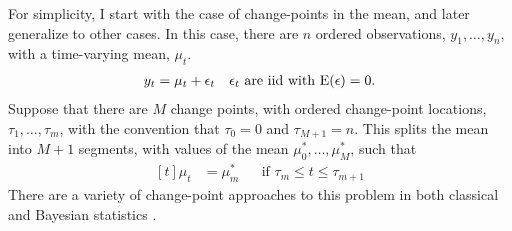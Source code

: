 For simplicity, I start with the case of change-points in the mean, and later generalize to other cases.
In this case, there are $n$ ordered observations, $y_{1}, \dots, y_{n}$, with a time-varying mean, $\mu_{t}$.
\begin{equation}
  \label{dlm:eq:17}
  \begin{aligned}[t]
    y_{t} & = \mu_{t} + \epsilon_{t} && \text{$\epsilon_{t}$ are iid with $\operatorname{E}(\epsilon) = 0$.} \\  
  \end{aligned}
\end{equation}
Suppose that there are $M$ change points, with ordered change-point locations, $\tau_{1}, \dots, \tau_{m}$, with the convention that $\tau_{0} = 0$ and $\tau_{M + 1} = n$.
This splits the mean into $M + 1$ segments, with values of the mean $\mu^{*}_{0}, \dots, \mu^{*}_{M}$,  such that
\begin{equation}
  \label{dlm:eq:1}
  \begin{aligned}[t]
    \mu_{t} &= \mu^{*}_{m} && \text{if $\tau_{m} \leq t \leq \tau_{m + 1}$}
  \end{aligned}
\end{equation}
There are a variety of change-point approaches to this problem in both classical \parencites{Page1954a}{Hinkley1970a}{BaiPerron2003a}{OlshenVenkatramanLucitoEtAl2004}{BaiPerron1998}{KillickFearnheadEckley2012} and Bayesian statistics \parencites{Yao1984}{BarryHartigan1993}{Chib1998}{Fearnhead2006a}{FearnheadLiu2007a}.

